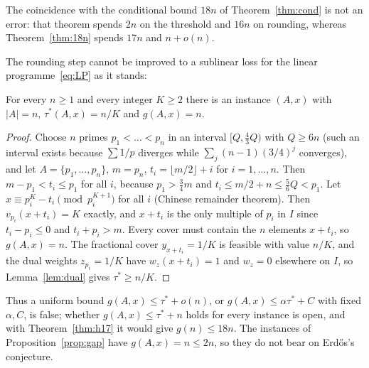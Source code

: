 The coincidence with the conditional bound $18n$ of Theorem~\ref{thm:cond} is not an error: that theorem spends
$2n$ on the threshold and $16n$ on rounding, whereas Theorem~\ref{thm:18n} spends $17n$ and $n+o(n)$.

The rounding step cannot be improved to a sublinear loss for the linear programme~\eqref{eq:LP} as it stands:

\begin{proposition}\label{prop:gap}
For every $n\ge1$ and every integer $K\ge2$ there is an instance $(A,x)$ with $|A|=n$, $\tau^*(A,x)=n/K$ and
$g(A,x)=n$.
\end{proposition}
\begin{proof}
Choose $n$ primes $p_1<\dots<p_n$ in an interval $[Q,\tfrac43Q)$ with $Q\ge6n$ (such an interval exists because
$\sum1/p$ diverges while $\sum_j(n-1)(3/4)^j$ converges), and let $A=\{p_1,\dots,p_n\}$, $m=p_n$,
$t_i=\lfloor m/2\rfloor+i$ for $i=1,\dots,n$. Then $m-p_1<t_i\le p_1$ for all $i$, because $p_1>\tfrac34m$ and
$t_i\le m/2+n\le\tfrac56Q<p_1$. Let $x\equiv p_i^K-t_i\pmod{p_i^{K+1}}$ for all $i$ (Chinese remainder theorem).
Then $v_{p_i}(x+t_i)=K$ exactly, and $x+t_i$ is the only multiple of $p_i$ in $I$ since $t_i-p_i\le0$ and
$t_i+p_i>m$. Every cover must contain the $n$ elements $x+t_i$, so $g(A,x)=n$. The fractional cover $y_{x+t_i}=1/K$
is feasible with value $n/K$, and the dual weights $z_{p_i}=1/K$ have $w_z(x+t_i)=1$ and $w_z=0$ elsewhere on $I$,
so Lemma~\ref{lem:dual} gives $\tau^*\ge n/K$.
\end{proof}

Thus a uniform bound $g(A,x)\le\tau^*+o(n)$, or $g(A,x)\le\alpha\tau^*+C$ with fixed $\alpha,C$, is false; whether
$g(A,x)\le\tau^*+n$ holds for every instance is open, and with Theorem~\ref{thm:h17} it would give $g(n)\le18n$.
The instances of Proposition~\ref{prop:gap} have $g(A,x)=n\le2n$, so they do not bear on Erd\H{o}s's conjecture.

